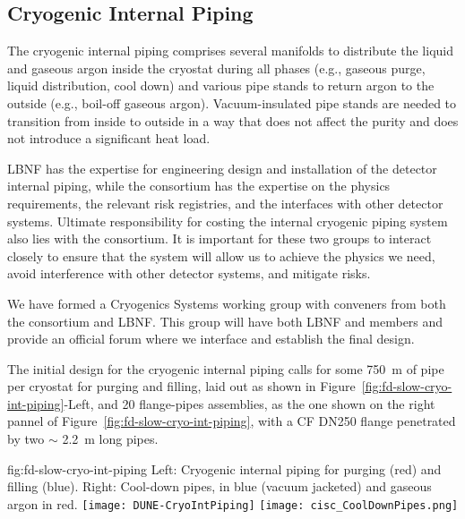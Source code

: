 \subsection{Cryogenic Internal Piping}
\label{sec:fdgen-slow-cryo-int-piping}
\label{sec:fdsp-slow-cryo-int-piping}
\label{sec:fddp-slow-cryo-int-piping}


The cryogenic internal piping comprises several manifolds to
distribute the liquid and gaseous argon inside the cryostat during all
phases (e.g., gaseous purge, liquid distribution, cool down) and
various pipe stands to return argon to the outside (e.g.,
boil-off gaseous argon).  Vacuum-insulated pipe stands are needed to
transition from inside to outside in a way that does not affect the
purity and does not introduce a significant heat load.

LBNF has the expertise for engineering design and installation of the
detector internal piping, while the  consortium has the expertise
on the physics requirements, the relevant risk registries, and the
interfaces with other detector systems. Ultimate responsibility for
costing the internal cryogenic piping system also lies with the 
consortium. It is important for these two groups to interact closely
to ensure that the system will allow us to achieve the physics we
need, avoid interference with other detector systems, and mitigate
risks.

We have formed a Cryogenics Systems working group with conveners from
both the  consortium and LBNF. This group will have both LBNF and
 members and provide an official forum where we interface and
establish the final design.

The initial design for the cryogenic internal piping calls for some
\SI{750}{m} of pipe per cryostat for purging and filling, laid out as
shown in Figure~\ref{fig:fd-slow-cryo-int-piping}-Left, and 20 flange-pipes assemblies, as the one shown
on the right pannel of Figure~\ref{fig:fd-slow-cryo-int-piping}, with a CF DN250 flange penetrated by two $\sim$ \SI{2.2}{m} long pipes.

\begin{dunefigure}{fig:fd-slow-cryo-int-piping}
  {Left: Cryogenic internal piping for purging (red) and filling (blue). Right: Cool-down pipes, \lar in blue (vacuum jacketed) and gaseous argon in red. }
  \texttt{[image: DUNE-CryoIntPiping]}
  \texttt{[image: cisc\_CoolDownPipes.png]}
\end{dunefigure}



